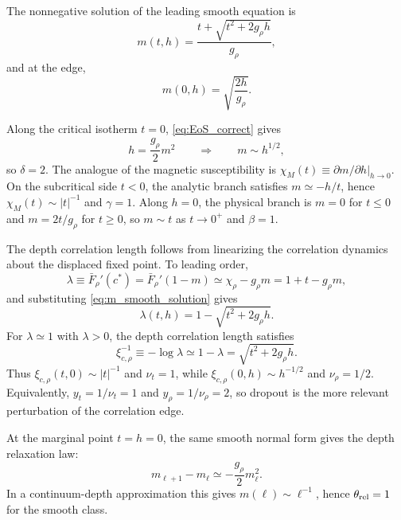 The nonnegative solution of the leading smooth equation is
\begin{equation}
m(t,h)=\frac{t+\sqrt{t^2+2g_\rho h}}{g_\rho},
\label{eq:m_smooth_solution}
\end{equation}
and at the edge,
\begin{equation}
m(0,h)=\sqrt{\frac{2h}{g_\rho}}.
\label{eq:m_at_edge}
\end{equation}

Along the critical isotherm \(t=0\), \eqref{eq:EoS_correct} gives
\begin{equation}
h=\frac{g_\rho}{2}m^2 \qquad\Rightarrow\qquad m\sim h^{1/2},
\end{equation}
so \(\delta=2\). The analogue of the magnetic susceptibility is \(\chi_M(t)\equiv \left.\partial m/\partial h\right|_{h\to 0}\).
On the subcritical side \(t<0\), the analytic branch satisfies \(m\simeq -h/t\), hence \(\chi_M(t)\sim |t|^{-1}\) and \(\gamma=1\).
Along \(h=0\), the physical branch is \(m=0\) for \(t\le 0\) and \(m=2t/g_\rho\) for \(t\ge 0\), so \(m\sim t\) as \(t\to 0^+\) and \(\beta=1\).

\vspace{0.25em}
\noindent
The depth correlation length follows from linearizing the correlation dynamics about the displaced fixed point.
To leading order,
\begin{equation}
\lambda \equiv \bar F_\rho'(c^*) = \bar F_\rho'(1-m)\simeq \chi_\rho-g_\rho m = 1+t-g_\rho m,
\end{equation}
and substituting \eqref{eq:m_smooth_solution} gives
\begin{equation}
\lambda(t,h)=1-\sqrt{t^2+2g_\rho h}.
\label{eq:lambda_smooth_correct}
\end{equation}
For \(\lambda\simeq 1\) with \(\lambda>0\), the depth correlation length satisfies
\begin{equation}
\xi_{c,\rho}^{-1}\equiv -\log\lambda \simeq 1-\lambda = \sqrt{t^2+2g_\rho h}.
\end{equation}
Thus \(\xi_{c,\rho}(t,0)\sim |t|^{-1}\) and \(\nu_t=1\), while \(\xi_{c,\rho}(0,h)\sim h^{-1/2}\) and \(\nu_\rho=1/2\).
Equivalently, \(y_t=1/\nu_t=1\) and \(y_\rho=1/\nu_\rho=2\), so dropout is the more relevant perturbation of the correlation edge.

At the marginal point \(t=h=0\), the same smooth normal form gives the depth relaxation law:
\begin{equation}
m_{\ell+1}-m_\ell\simeq-\frac{g_\rho}{2}m_\ell^2.
\end{equation}
In a continuum-depth approximation this gives \(m(\ell)\sim \ell^{-1}\), hence \(\theta_{\rm rel}=1\) for the smooth class.

